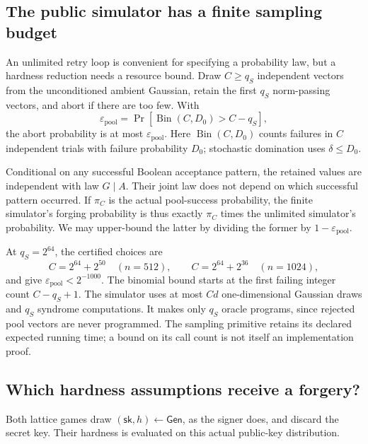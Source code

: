 \documentclass[11pt,a4paper]{article}
\newcommand{\eps}{\varepsilon}
\theoremstyle{definition}
\theoremstyle{remark}
\numberwithin{equation}{section}
\begin{document}
\subsection{The public simulator has a finite sampling budget}

An unlimited retry loop is convenient for specifying a probability law, but
a hardness reduction needs a resource bound. Draw $C\ge q_S$ independent
vectors from the unconditioned ambient Gaussian, retain the first $q_S$
norm-passing vectors, and abort if there are too few. With
\begin{equation}
 \eps_{\mathrm{pool}}=
  \Pr[\operatorname{Bin}(C,D_0)>C-q_S],
 \label{eq:finite-pool}
\end{equation}
the abort probability is at most $\eps_{\mathrm{pool}}$. Here
$\operatorname{Bin}(C,D_0)$ counts failures in $C$ independent trials with
failure probability $D_0$; stochastic domination uses $\delta\le D_0$.

Conditional on any successful Boolean acceptance pattern, the retained
values are independent with law $G\mid A$. Their joint law does not depend
on which successful pattern occurred. If $\pi_C$ is the actual pool-success
probability, the finite simulator's forging probability is thus exactly
$\pi_C$ times the unlimited simulator's probability. We may upper-bound
the latter by dividing the former by $1-\eps_{\mathrm{pool}}$.

At $q_S=2^{64}$, the certified choices are
\begin{equation}
 C=2^{64}+2^{50}\quad(n=512),\qquad
 C=2^{64}+2^{36}\quad(n=1024),
\end{equation}
and give $\eps_{\mathrm{pool}}<2^{-1000}$. The binomial bound starts at
the first failing integer count $C-q_S+1$. The simulator uses at most $Cd$
one-dimensional Gaussian draws and $q_S$ syndrome computations. It makes
only $q_S$ oracle programs, since rejected pool vectors are never programmed.
The sampling primitive retains its declared expected running time; a bound
on its call count is not itself an implementation proof.

\subsection{Which hardness assumptions receive a forgery?}

Both lattice games draw $(\mathsf{sk},h)\leftarrow\mathsf{Gen}$, as the
signer does, and discard the secret key. Their hardness is evaluated on
this actual public-key distribution.
\end{document}
